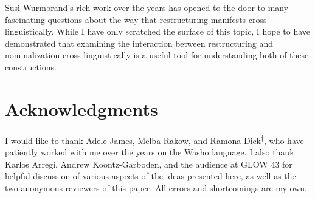 \documentclass[output=paper]{langscibook}
\begin{document}
 


 Susi Wurmbrand's rich work over the years has opened to the door to many fascinating questions about the way that restructuring manifests cross-linguistically. While I have only scratched  the surface of this topic, I hope to have demonstrated that examining the interaction between restructuring and nominalization cross-linguistically is a useful tool for understanding both of these constructions.



\section*{Acknowledgments}
I would like to thank Adele James, Melba Rakow, and Ramona Dick\textsuperscript{†}, who have patiently worked with me over the years on the Washo language. I also thank Karlos Arregi, Andrew Koontz-Garboden, and the audience at GLOW 43 for helpful discussion of various aspects of the ideas presented here, as well as the two anonymous reviewers of this paper. All errors and shortcomings are my own.
\end{document}
